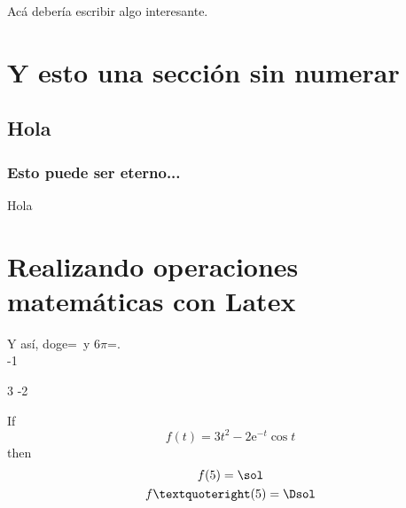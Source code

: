 \documentclass[]{article}
\begin{document}
Acá debería escribir algo interesante.

\section*{Y esto una sección sin numerar}

\subsection{Hola}

\subsubsection{Esto puede ser eterno...}
Hola

\newpage
\section{Realizando operaciones matemáticas con Latex}

\newcommand{\mult}[3]{
	\MULTIPLY{#1}{#2}{#3}
}

\mult{\numberPI}{6}{\seisPI}
\mult{2}{4}{\doge}

Y así, doge=\doge\ y $6\pi$=\seisPI. \\

\SCALEVARIABLEfunction
{-1}{\EXPfunction}
{\NEGEXPfunction}


\PRODUCTfunction
{\NEGEXPfunction}
{\COSfunction}
{\NEGEXPCOSfunction}

\LINEARCOMBINATIONfunction
{3}{\SQUAREfunction}
{-2}{\NEGEXPCOSfunction}
{\myfunction}


If
\[
f(t)=3t^2-2\mathrm{e}^{-t}\cos t
\]
then
\[
\begin{gathered}
f(5)=\sol\\
f’(5)=\Dsol
\end{gathered}
\]
\end{document}

